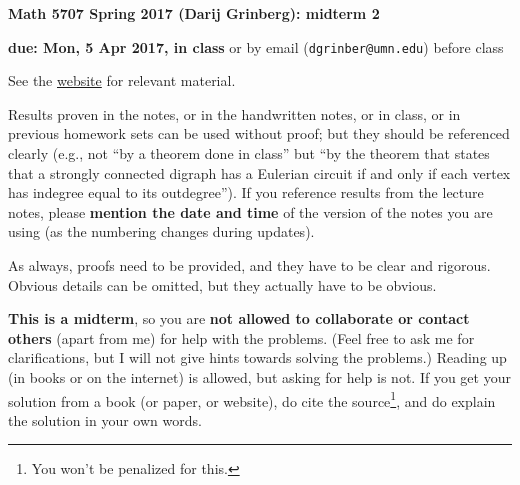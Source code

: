 \documentclass[numbers=enddot,12pt,final,onecolumn,notitlepage]{scrartcl}%
\theoremstyle{definition}
\begin{document}
\begin{center}
\textbf{Math 5707 Spring 2017 (Darij Grinberg): midterm 2}

\textbf{due: Mon, 5 Apr 2017, in class} or by email
(\texttt{dgrinber@umn.edu}) before class
\end{center}

See the \href{http://www-users.math.umn.edu/~dgrinber/5707s17}{website} for relevant material.

{\small Results proven in the notes, or in the handwritten notes, or in class, or in previous homework sets can be used without proof; but they should be referenced clearly (e.g., not ``by a theorem done in class'' but ``by the theorem that states that a strongly connected digraph has a Eulerian circuit if and only if each vertex has indegree equal to its outdegree'').
If you reference results from the lecture notes, please \textbf{mention the date and time} of the version of the notes you are using (as the numbering changes during updates).

As always, proofs need to be provided, and they have to be clear and rigorous. Obvious details can be omitted, but they actually have to be obvious.



\textbf{This is a midterm}, so you are \textbf{not allowed to collaborate or contact others} (apart from me) for help with the problems. (Feel free to ask me for clarifications, but I will not give hints towards solving the problems.) Reading up (in books or on the internet) is allowed, but asking for help is not. If you get your solution from a book (or paper, or website), do cite the source\footnote{You won't be penalized for this.}, and do explain the solution in your own words. }
\end{document}
